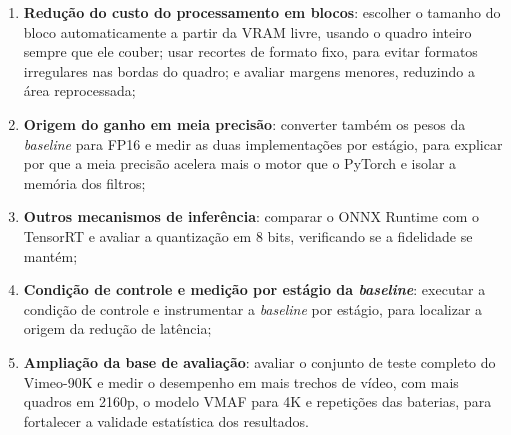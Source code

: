 \documentclass[
    12pt,                %
    openright,           %
    oneside,             %
    a4paper,             %
    english,             %
    brazil               %
]{abntex2}
\begin{document}
\begin{enumerate}
    \item \textbf{Redução do custo do processamento em blocos}: escolher o tamanho do bloco automaticamente a partir da VRAM livre, usando o quadro inteiro sempre que ele couber; usar recortes de formato fixo, para evitar formatos irregulares nas bordas do quadro; e avaliar margens menores, reduzindo a área reprocessada;
    \item \textbf{Origem do ganho em meia precisão}: converter também os pesos da \textit{baseline} para FP16 e medir as duas implementações por estágio, para explicar por que a meia precisão acelera mais o motor que o PyTorch e isolar a memória dos filtros;
    \item \textbf{Outros mecanismos de inferência}: comparar o ONNX Runtime com o TensorRT e avaliar a quantização em 8 bits, verificando se a fidelidade se mantém;
    \item \textbf{Condição de controle e medição por estágio da \textit{baseline}}: executar a condição de controle e instrumentar a \textit{baseline} por estágio, para localizar a origem da redução de latência;
    \item \textbf{Ampliação da base de avaliação}: avaliar o conjunto de teste completo do Vimeo-90K \cite{Xue2019} e medir o desempenho em mais trechos de vídeo, com mais quadros em 2160p, o modelo VMAF para 4K e repetições das baterias, para fortalecer a validade estatística dos resultados.
\end{enumerate}

\postextual

%
%
%

\end{document}
